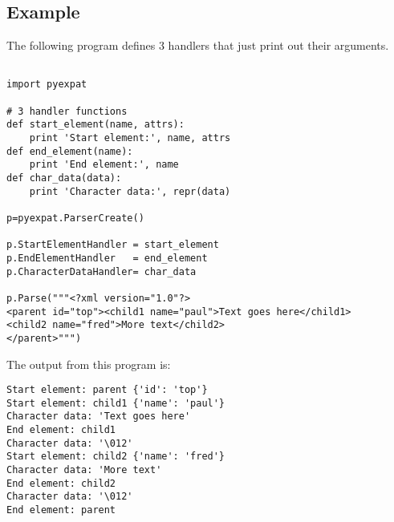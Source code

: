 \subsection{Example}

The following program defines 3 handlers that just print out their
arguments.

\begin{verbatim}

import pyexpat

# 3 handler functions
def start_element(name, attrs):
    print 'Start element:', name, attrs
def end_element(name):
    print 'End element:', name
def char_data(data):
    print 'Character data:', repr(data)

p=pyexpat.ParserCreate()

p.StartElementHandler = start_element
p.EndElementHandler   = end_element
p.CharacterDataHandler= char_data

p.Parse("""<?xml version="1.0"?>
<parent id="top"><child1 name="paul">Text goes here</child1>
<child2 name="fred">More text</child2>
</parent>""")
\end{verbatim}

The output from this program is:

\begin{verbatim}
Start element: parent {'id': 'top'}
Start element: child1 {'name': 'paul'}
Character data: 'Text goes here'
End element: child1
Character data: '\012'
Start element: child2 {'name': 'fred'}
Character data: 'More text'
End element: child2
Character data: '\012'
End element: parent
\end{verbatim}
